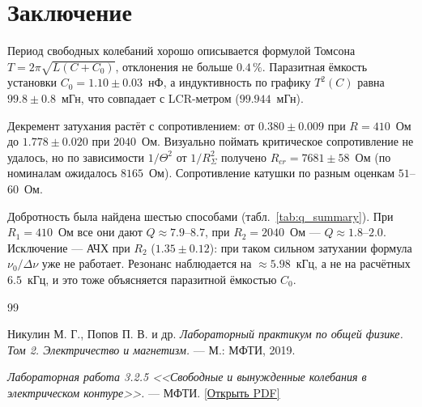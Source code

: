 \documentclass[reprint, amsmath, amssymb, aps, pra, nofootinbib]{revtex4-2}
\begin{document}
\section{Заключение}
Период свободных колебаний хорошо описывается формулой Томсона $T=2\pi\sqrt{L(C+C_0)}$, отклонения не больше $0.4\,\%$. Паразитная ёмкость установки $C_0 = 1.10 \pm 0.03$~нФ, а индуктивность по графику $T^2(C)$ равна $99.8 \pm 0.8$~мГн, что совпадает с LCR-метром ($99.944$~мГн).

Декремент затухания растёт с сопротивлением: от $0.380 \pm 0.009$ при $R = 410$~Ом до $1.778 \pm 0.020$ при $2040$~Ом. Визуально поймать критическое сопротивление не удалось, но по зависимости $1/\Theta^2$ от $1/R_\Sigma^2$ получено $R_{cr} = 7681 \pm 58$~Ом (по номиналам ожидалось $8165$~Ом). Сопротивление катушки по разным оценкам $51$--$60$~Ом.

Добротность была найдена шестью способами (табл.~\ref{tab:q_summary}). При $R_1 = 410$~Ом все они дают $Q \approx 7.9$--$8.7$, при $R_2 = 2040$~Ом — $Q \approx 1.8$--$2.0$. Исключение — АЧХ при $R_2$ ($1.35 \pm 0.12$): при таком сильном затухании формула $\nu_0/\Delta\nu$ уже не работает. Резонанс наблюдается на $\approx 5.98$~кГц, а не на расчётных $6.5$~кГц, и это тоже объясняется паразитной ёмкостью $C_0$.


\begin{thebibliography}{99}

Никулин М. Г., Попов П. В. и др. \textit{Лабораторный практикум по общей физике. Том 2. Электричество и магнетизм.} — М.: МФТИ, 2019.

\textit{Лабораторная работа 3.2.5 <<Свободные и вынужденные
колебания в электрическом контуре>>.} — МФТИ. \href{https://mipt.ru/upload/%D0%9A%D0%B0%D1%84%D0%B5%D0%B4%D1%80%D0%B0%20%D0%BE%D0%B1%D1%89%D0%B5%D0%B9%20%D1%84%D0%B8%D0%B7%D0%B8%D0%BA%D0%B8/3/lab/%D0%A1%D0%B2%D0%BE%D0%B1%D0%BE%D0%B4%D0%BD%D1%8B%D0%B5%20%D0%B8%20%D0%B2%D1%8B%D0%BD%D1%83%D0%B6%D0%B4%D0%B5%D0%BD%D0%BD%D1%8B%D0%B5%20%D0%BA%D0%BE%D0%BB%D0%B5%D0%B1%D0%B0%D0%BD%D0%B8%D1%8F.pdf}{[Открыть PDF]}

\end{thebibliography}
\end{document}
